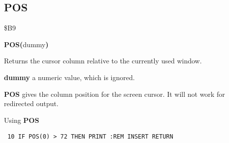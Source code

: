 
\newpage
\subsection{POS}
\begin{description}[leftmargin=2cm,style=nextline]
\item [Token:] \$B9
\item [Format:] {\bf POS(}dummy{\bf)}
\item [Usage:]  Returns the cursor column relative to the
                currently used window.

                {\bf dummy} a numeric value, which is ignored.

\item [Remarks:] {\bf POS} gives the column position for the screen
                 cursor. It will not work for redirected output.

\item [Example:] Using {\bf POS}

\begin{tcolorbox}[colback=black,coltext=white]
\verbatimfont{\codefont}
\begin{verbatim}
 10 IF POS(0) > 72 THEN PRINT :REM INSERT RETURN
\end{verbatim}
\end{tcolorbox}
\end{description}


\newpage
